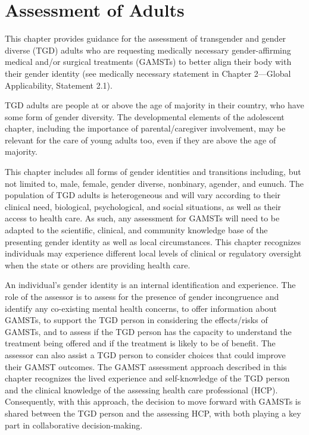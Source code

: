 \documentclass[
]{book}
\begin{document}
\hypertarget{assessment-of-adults}{%
\chapter{Assessment of Adults}\label{assessment-of-adults}}

This chapter provides guidance for the assessment
of transgender and gender diverse (TGD) adults
who are requesting medically necessary
gender-affirming medical and/or surgical treatments
(GAMSTs) to better align their body with their
gender identity (see medically necessary statement
in Chapter 2---Global Applicability, Statement 2.1).

TGD adults are people at or above the age of
majority in their country, who have some form
of gender diversity. The developmental elements
of the adolescent chapter, including the importance of parental/caregiver involvement, may be
relevant for the care of young adults too, even if
they are above the age of majority.

This chapter includes all forms of gender identities and transitions including, but not limited
to, male, female, gender diverse, nonbinary, agender, and eunuch. The population of TGD adults
is heterogeneous and will vary according to their
clinical need, biological, psychological, and social
situations, as well as their access to health care.
As such, any assessment for GAMSTs will need
to be adapted to the scientific, clinical, and community knowledge base of the presenting gender
identity as well as local circumstances. This chapter recognizes individuals may experience different local levels of clinical or regulatory oversight
when the state or others are providing health care.

An individual's gender identity is an internal
identification and experience. The role of the
assessor is to assess for the presence of gender
incongruence and identify any co-existing mental
health concerns, to offer information about
GAMSTs, to support the TGD person in considering the effects/risks of GAMSTs, and to assess
if the TGD person has the capacity to understand
the treatment being offered and if the treatment
is likely to be of benefit. The assessor can also
assist a TGD person to consider choices that
could improve their GAMST outcomes. The
GAMST assessment approach described in this
chapter recognizes the lived experience and
self-knowledge of the TGD person and the clinical knowledge of the assessing health care professional (HCP). Consequently, with this approach,
the decision to move forward with GAMSTs is
shared between the TGD person and the
assessing HCP, with both playing a key part in
collaborative decision-making.
\end{document}
